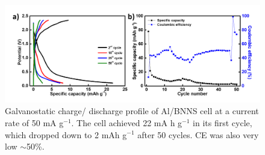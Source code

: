 \begin{figure}[tbh!]
\centering
\includegraphics[width=\textwidth]{Figures/BOhBN/BNNSCDCCE}
\caption{Galvanostatic charge/ discharge profile of Al/BNNS cell at a current rate of 50 mA g$^{-1}$. The cell achieved 22 mA h g$^{-1}$ in its first cycle, which dropped down to 2 mAh g$^{-1}$ after 50 cycles. CE was also very low $\sim$50\%. }
\label{Figures/BOhBN:BNNSCDCCE}
\end{figure}

